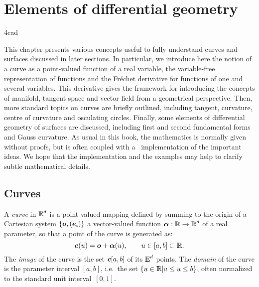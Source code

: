 \documentclass{31x47jw}
\begin{document}
          
                              
    \setcounter{chapter}{4}   
    \setcounter{page}{13}     
 

\chapter{Elements of differential geometry}
\label{chapt:diffgeom}
\gp4cad

This chapter presents various concepts useful to fully
understand curves and surfaces discussed in later sections.  In
particular, we introduce here the notion of a curve as a point-valued
function of a real variable, the variable-free representation of
functions and the Fr\'echet derivative for functions of one and
several variables.  This derivative gives the framework for
introducing the concepts of manifold, tangent space and vector field
from a geometrical perspective.  Then, more standard topics on
curves are briefly outlined, including tangent, curvature, centre of
curvature and osculating circles.  Finally, some elements of
differential geometry of surfaces are discussed, including first and
second fundamental forms and Gauss curvature.  As usual in this book,
the mathematics is normally given without proofs, but is often coupled
with a \pl\ implementation of the important ideas.  We hope that
the implementation and the examples may help to clarify subtle
mathematical details.


\section{Curves}
\label{sec:curves}

A \emph{curve} in $ \mathbb{I\!\!E}^d$ is a point-valued mapping defined by summing
to the origin of a Cartesian system $\{ {\mbox{\boldmath $o$}}, ({\mbox{\boldmath $e$}}_{i}) \}$ a
vector-valued function ${\mbox{\boldmath $\alpha$}}: \mathbb{I\!\!R} \rightarrow \mathbb{I\!\!R}^{d}$ of a real
parameter, so that a point of the curve is generated as:
\[
{\mbox{\boldmath $c$}}(u) = {\mbox{\boldmath $o$}} + {\mbox{\boldmath $\alpha$}}(u), \qquad u\in[a,b]\subset\mathbb{I\!\!R}.
\]
The \emph{image} of the curve is the set ${\mbox{\boldmath $c$}}[a,b]$ of its $ \mathbb{I\!\!E}^d$
points.  The \emph{domain} of the curve is the parameter interval
$[a,b]$, i.e.~the set $\{u\in\mathbb{I\!\!R} | a\leq u\leq b \}$, often norm\-alized to
the standard unit interval~$[0,1]$.
\end{document}

